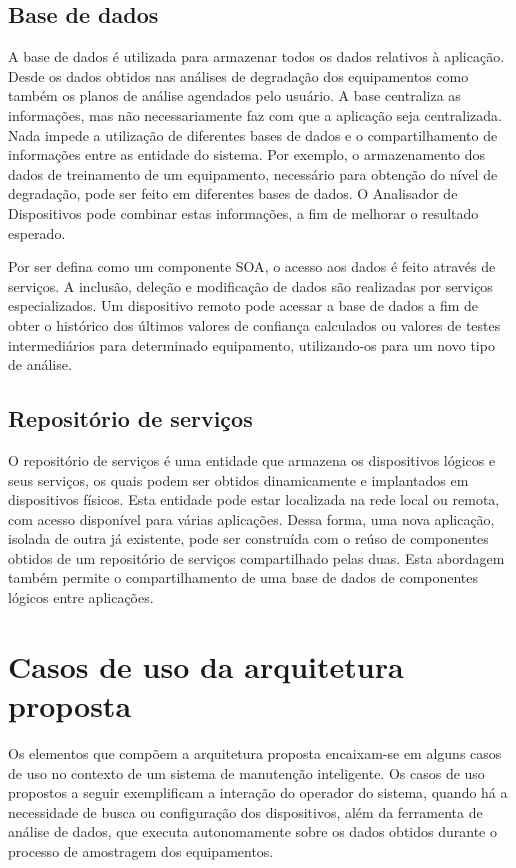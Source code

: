 \subsection{Base de dados}

A base de dados é utilizada para armazenar todos os dados relativos à aplicação. Desde os dados
obtidos nas análises de degradação dos equipamentos como também os planos de análise agendados pelo
usuário. A base centraliza as informações, mas não necessariamente faz com que a aplicação seja
centralizada. Nada impede a utilização de diferentes bases de
dados e o compartilhamento de informações entre as entidade do sistema. Por exemplo, o armazenamento
dos dados de treinamento de um equipamento, necessário para obtenção do nível de degradação, pode
ser feito em diferentes bases de dados. O Analisador de Dispositivos pode combinar estas
informações, a fim de melhorar o resultado esperado.

Por ser defina como um componente \gls{SOA}, o acesso aos dados é feito através de serviços. A
inclusão, deleção e modificação de dados são realizadas por serviços especializados. Um dispositivo
remoto pode acessar a base de dados a fim de obter o histórico dos últimos valores de confiança
calculados ou valores de testes intermediários para determinado equipamento, utilizando-os para um
novo tipo de análise.


\subsection{Repositório de serviços}

O repositório de serviços é uma entidade que armazena os dispositivos lógicos e seus serviços, os
quais podem ser obtidos dinamicamente e implantados em dispositivos físicos. Esta entidade pode
estar localizada na rede local ou remota, com acesso disponível para várias aplicações. Dessa forma,
uma nova aplicação, isolada de outra já existente, pode ser construída com o reúso de componentes
obtidos de um repositório de serviços compartilhado pelas duas. Esta abordagem também permite o
compartilhamento de uma base de dados de componentes lógicos entre aplicações.


\section{Casos de uso da arquitetura proposta}

Os elementos que compõem a arquitetura proposta encaixam-se em alguns casos de uso no contexto de um
sistema de manutenção inteligente. Os casos de uso propostos a seguir exemplificam a interação do
operador do sistema, quando há a necessidade de busca ou configuração dos dispositivos, além da
ferramenta de análise de dados, que executa autonomamente sobre os dados obtidos durante o processo
de amostragem dos equipamentos.


